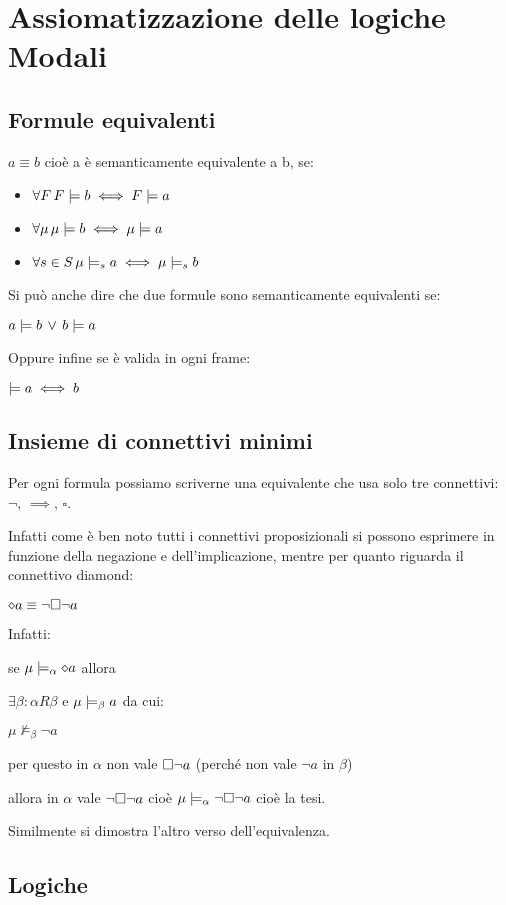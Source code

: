 
\chapter{Assiomatizzazione delle logiche Modali}


\section{Formule equivalenti}

$a\equiv b$ cioè a è semanticamente equivalente a b, se: 
\begin{itemize}
\item $\forall F\,F\models b\iff F\models a$ 
\item $\forall\mu\,\mu\models b\iff\mu\models a$ 
\item $\forall s\in S\,\mu\models_{s}a\iff\mu\models_{s}b$ 
\end{itemize}
Si può anche dire che due formule sono semanticamente equivalenti
se:

$a\models b\,\vee\,b\models a$

Oppure infine se è valida in ogni frame:

$\models a\iff b$


\section{Insieme di connettivi minimi}

Per ogni formula possiamo scriverne una equivalente che usa solo tre
connettivi: $\neg,\,\implies,\,\square$.

Infatti come è ben noto tutti i connettivi proposizionali si possono
esprimere in funzione della negazione e dell'implicazione, mentre
per quanto riguarda il connettivo diamond:

$\diamond a\equiv\neg\square\neg a$

Infatti:

se $\mu\models_{\alpha}\diamond a$ allora

$\exists\beta:$$\alpha R\beta$ e $\mu\models_{\beta}a$ da cui:

$\mu\nvDash_{\beta}\neg a$

per questo in $\alpha$ non vale $\square\neg a$ (perché non vale
$\neg a$ in $\beta$)

allora in $\alpha$ vale $\neg\square\neg a$ cioè $\mu\models_{\alpha}\neg\square\neg a$
cioè la tesi.

Similmente si dimostra l'altro verso dell'equivalenza.


\section{Logiche}


